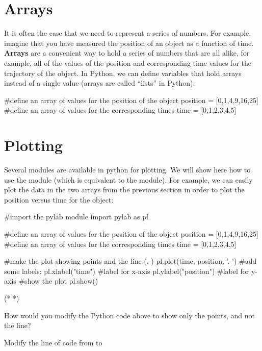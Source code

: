 \section{Arrays}
It is often the case that we need to represent a series of numbers. For example, imagine that you have measured the position of an object as a function of time. \textbf{Arrays} are a convenient way to hold a series of numbers that are all alike, for example, all of the values of the position and corresponding time values for the trajectory of the object. In Python, we can define variables that hold arrays instead of a single value (arrays are called ``lists'' in Python):
\begin{python}[caption=Arrays in python]
#define an array of values for the position of the object
position = [0,1,4,9,16,25]
#define an array of values for the corresponding times
time = [0,1,2,3,4,5]
\end{python}

\section{Plotting}
Several modules are available in python for plotting. We will show here how to use the  module (which is equivalent to the  module). For example, we can easily plot the data in the two arrays from the previous section in order to plot the position versus time for the object:
\begin{python}[caption=Plotting two arrays]
#import the pylab module
import pylab as pl

#define an array of values for the position of the object
position = [0,1,4,9,16,25]
#define an array of values for the corresponding times
time = [0,1,2,3,4,5]

#make the plot showing points and the line (.-)
pl.plot(time, position, '.-')
#add some labels:
pl.xlabel("time") #label for x-axis
pl.ylabel("position") #label for y-axis
#show the plot
pl.show()

\end{python}
\begin{poutput}
(*   *)
\end{poutput}

\begin{checkpoint}{How would you modify the Python code above to show only the points, and not the line?}
\begin{answer}
Modify the line of code from  to 
\end{answer}
\end{checkpoint}

